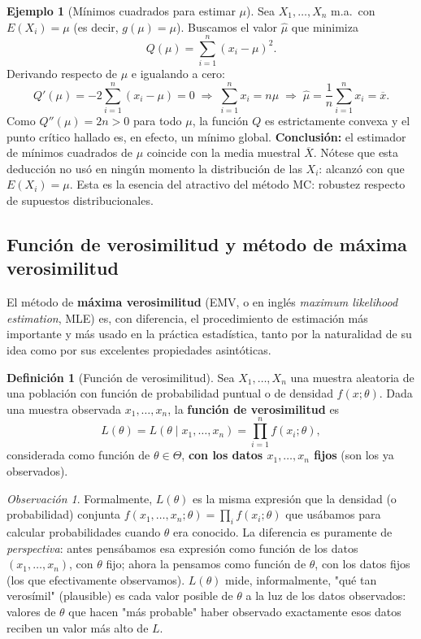 \documentclass[11pt,a4paper]{article}
\theoremstyle{plain}
\theoremstyle{definition}
\newtheorem{definicion}[teorema]{Definición}
\newtheorem{ejemplo}[teorema]{Ejemplo}
\theoremstyle{remark}
\newtheorem{observacion}[teorema]{Observación}
\begin{document}
\begin{ejemplo}[Mínimos cuadrados para estimar $\mu$]
Sea $X_1,\dots,X_n$ m.a.\ con $E(X_i)=\mu$ (es decir, $g(\mu)=\mu$). Buscamos el valor $\widehat\mu$ que minimiza
\[
Q(\mu) = \sum_{i=1}^n (x_i-\mu)^2.
\]
Derivando respecto de $\mu$ e igualando a cero:
\[
Q'(\mu) = -2\sum_{i=1}^n (x_i-\mu) = 0 \;\Longrightarrow\; \sum_{i=1}^n x_i = n\mu \;\Longrightarrow\; \widehat\mu = \frac1n\sum_{i=1}^n x_i = \overline x.
\]
Como $Q''(\mu)=2n>0$ para todo $\mu$, la función $Q$ es estrictamente convexa y el punto crítico hallado es, en efecto, un mínimo global. \textbf{Conclusión:} el estimador de mínimos cuadrados de $\mu$ coincide con la media muestral $\overline X$. Nótese que esta deducción no usó en ningún momento la distribución de las $X_i$: alcanzó con que $E(X_i)=\mu$. Esta es la esencia del atractivo del método MC: robustez respecto de supuestos distribucionales.
\end{ejemplo}

\subsection{Función de verosimilitud y método de máxima verosimilitud}
\label{sec:mv}

El método de \textbf{máxima verosimilitud} (EMV, o en inglés \emph{maximum likelihood estimation}, MLE) es, con diferencia, el procedimiento de estimación más importante y más usado en la práctica estadística, tanto por la naturalidad de su idea como por sus excelentes propiedades asintóticas.

\begin{definicion}[Función de verosimilitud]
Sea $X_1,\dots,X_n$ una muestra aleatoria de una población con función de probabilidad puntual o de densidad $f(x;\theta)$. Dada una muestra observada $x_1,\dots,x_n$, la \textbf{función de verosimilitud} es
\[
L(\theta) = L(\theta\mid x_1,\dots,x_n) = \prod_{i=1}^n f(x_i;\theta),
\]
considerada como función de $\theta\in\Theta$, \textbf{con los datos $x_1,\dots,x_n$ fijos} (son los ya observados).
\end{definicion}

\begin{observacion}
Formalmente, $L(\theta)$ es la misma expresión que la densidad (o probabilidad) conjunta $f(x_1,\dots,x_n;\theta)=\prod_i f(x_i;\theta)$ que usábamos para calcular probabilidades cuando $\theta$ era conocido. La diferencia es puramente de \emph{perspectiva}: antes pensábamos esa expresión como función de los datos $(x_1,\dots,x_n)$, con $\theta$ fijo; ahora la pensamos como función de $\theta$, con los datos fijos (los que efectivamente observamos). $L(\theta)$ mide, informalmente, "qué tan verosímil" (plausible) es cada valor posible de $\theta$ a la luz de los datos observados: valores de $\theta$ que hacen "más probable" haber observado exactamente esos datos reciben un valor más alto de $L$.
\end{observacion}
\end{document}
